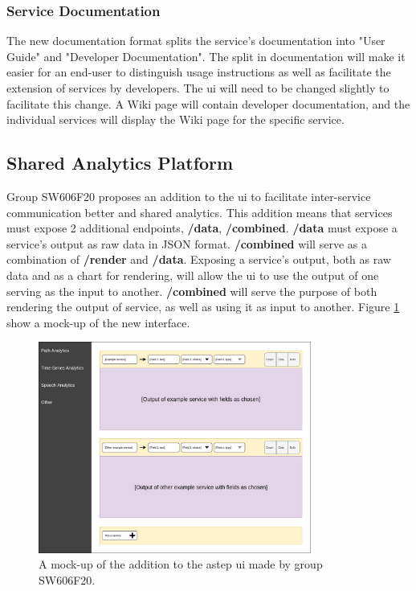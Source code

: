 \subsubsection{Service Documentation}
The new documentation format splits the service's documentation into "User Guide" and "Developer Documentation". The split in documentation will make it easier for an end-user to distinguish usage instructions as well as facilitate the extension of services by developers. The \gls{ui} will need to be changed slightly to facilitate this change. A Wiki page will contain developer documentation, and the individual services will display the Wiki page for the specific service.

\subsection{Shared Analytics Platform} \label{sc:sap}
Group SW606F20 proposes an addition to the \gls{ui} to facilitate inter-service communication better and shared analytics. This addition means that services must expose 2 additional \glspl{endpoint}, \textbf{/data}, \textbf{/combined}. \textbf{/data} must expose a service's output as raw data in JSON format. \textbf{/combined} will serve as a combination of \textbf{/render} and \textbf{/data}. Exposing a service's output, both as raw data and as a chart for rendering, will allow the \gls{ui} to use the output of one serving as the input to another. \textbf{/combined} will serve the purpose of both rendering the output of service, as well as using it as input to another. Figure \ref{fig:ui-addition} show a mock-up of the new interface.

\begin{figure}[htbp]
    \centering
    \includegraphics[width=0.8\textwidth]{Pictures/Sprint_1/single-interface.png}
    \caption{A mock-up of the addition to the \gls{astep} \gls{ui} made by group SW606F20.\cite{astep}}
    \label{fig:ui-addition}
\end{figure}

